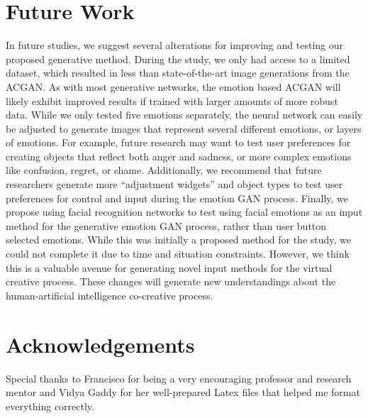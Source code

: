 \documentclass{sigchi}
\begin{document}
\section{Future Work}
In future studies, we suggest several alterations for improving and testing our proposed generative method. During the study, we only had access to a limited dataset, which resulted in less than state-of-the-art image generations from the ACGAN. As with most generative networks, the emotion based ACGAN will likely exhibit improved results if trained with larger amounts of more robust data. While we only tested five emotions separately, the neural network can easily be adjusted to generate images that represent several different emotions, or layers of emotions. For example, future research may want to test user preferences for creating objects that reflect both anger and sadness, or more complex emotions like confusion, regret, or shame. Additionally, we recommend that future researchers generate more “adjustment widgets” and object types to test user preferences for control and input during the emotion GAN process. Finally, we propose using facial recognition networks to test using facial emotions as an input method for the generative emotion GAN process, rather than user button selected emotions. While this was initially a proposed method for the study, we could not complete it due to time and situation constraints. However, we think this is a valuable avenue for generating novel input methods for the virtual creative process. These changes will generate new understandings about the human-artificial intelligence co-creative process.

\section{Acknowledgements}
Special thanks to Francisco for being a very encouraging professor and research mentor and Vidya Gaddy for her well-prepared Latex files that helped me format everything correctly.

\end{document}
